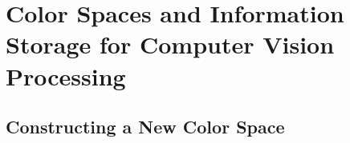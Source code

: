 \newcommand{\unitSrc}{\text{uSrc}}       %
\newcommand{\uSrc}{\unitSrc}             %
\newcommand{\intSrc}{\text{iSrc}}        %
\newcommand{\iSrc}{\intSrc}              %
\newcommand{\srcMax}{\text{srcMax}}      %
\newcommand{\srcMin}{\text{srcMin}}      %
\newcommand{\srcRange}{\text{srcRange}}  %

\newcommand{\unitX}{\text{uX}}       %
\newcommand{\uX}{\unitX}             %
\newcommand{\intX}{\text{iX}}        %
\newcommand{\iX}{\intX}              %
\newcommand{\xMax}{\text{xMax}}      %
\newcommand{\xMin}{\text{xMin}}      %
\newcommand{\xRange}{\text{xRange}}  %

\newcommand{\unitY}{\text{uY}}       %
\newcommand{\uY}{\unitY}             %
\newcommand{\intY}{\text{iY}}        %
\newcommand{\iY}{\intY}              %
\newcommand{\yMax}{\text{yMax}}      %
\newcommand{\yMin}{\text{yMin}}      %
\newcommand{\yRange}{\text{yRange}}  %

\newcommand{\unitR}{\text{uR}}
\newcommand{\uR}{\unitR}
\newcommand{\intR}{\text{iR}}
\newcommand{\iR}{\intR}
\newcommand{\discreteR}{\widetilde{\uR}}
\newcommand{\dR}{\discreteR}
\newcommand{\delR}{\delta\uR}
\newcommand{\rRange}{\text{rRange}}  %


\chapter{Color Spaces and Information Storage for Computer Vision Processing} \label{sec:Chap2}

\ifpdf
    \graphicspath{{Chapter2/Figs/Raster/}{Chapter2/Figs/PDF/}{Chapter2/Figs/}}
\else
    \graphicspath{{Chapter2/Figs/Vector/}{Chapter2/Figs/}}
\fi


\section{Constructing a New Color Space}\label{sec:ConstructingANewColorSpace}

